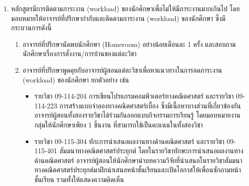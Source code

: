 \begin{enumerate}
\item หลักสูตรมีการติดตามภาระงาน (workload) ของนักศึกษาเพื่อไม่ให้มีภาระงานมากเกินไป  โดยมอบหมายให้อาจารย์ที่ปรึกษากำกับและติดตามภาระงาน (workload) ของนักศึกษา ซึ่งมีกระบวนการดังนี้
 		\begin{enumerate}[label=(\arabic*),leftmargin=0.8cm, labelsep=2mm]
		\item อาจารย์ที่ปรึกษานัดพบนักศึกษา (Homeroom) อย่างน้อยเดือนละ 1 ครั้ง และสอบถามนักศึกษาเรื่องการสั่งงาน/การบ้านของแต่ละวิชา
		\item อาจารย์ที่ปรึกษาพูดคุยกับอาจารย์ผู้สอนแต่ละวิชาเพื่อหาแนวทางในการลดภาระงาน (workload) ของนักศึกษา ยกตัวอย่าง เช่น  
		\begin{itemize}
			\item รายวิชา 09-114-204 การเขียนโปรแกรมคอมพิวเตอร์ทางคณิตศาสตร์ และรายวิชา 09-114-223 การสร้างแบบจำลองทางคณิตศาสตร์เบื้อง ซึ่งมีเนื้อหาบางส่วนที่เกี่ยวข้องกัน  อาจารย์ผู้สอนทั้งสองรายวิชาได้ร่วมกันออกแบบกิจกรรมการเรียนรู้ โดยมอบหมายงานกลุ่มให้นักศึกษาเพียง 1 ชิ้นงาน ที่สามารถใช้เป็นคะแนนในทั้งสองวิชา
			\item รายวิชา 09-115-304 ทักะการนำเสนอผลงานทางด้านคณิตศาสตร์ และรายวิชา  09-115-401 สัมมนาทางคณิตศาสตร์ประยุกต์ โดยในรายวิชาทักษะการนำเสนอผลงานทางด้านคณิตศาสตร์  อาจารย์ผู้สอนให้นักศึกษานำบทความวิจัยที่นำเสนอในรายวิชาสัมมนาทางคณิตศาสตร์ประยุกต์มาฝึกนำเสนอหน้าชั้นเรียนและเปิดโอกาสให้เพื่อนซักถามหน้าชั้นเรียน รวมทั้งให้แสดงความคิดเห็น
		\end{itemize}
		\end{enumerate}

\end{enumerate}
\begin{doclist}
\end{doclist}



